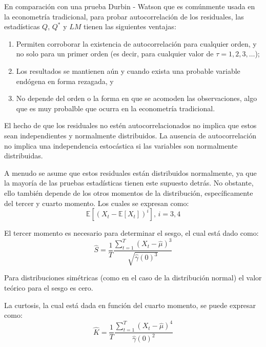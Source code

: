 \documentclass[
]{book}
\begin{document}
En comparación con una prueba Durbin - Watson que es comúnmente usada en la econometría tradicional, para probar autocorrelación de los residuales, las estadísticas \(Q\), \(Q^*\) y \(LM\) tienen las siguientes ventajas:

\begin{enumerate}
\def\labelenumi{\arabic{enumi}.}
\item
  Permiten corroborar la existencia de autocorrelación para cualquier orden, y no solo para un primer orden (es decir, para cualquier valor de \(\tau = 1, 2, 3, \ldots\));
\item
  Los resultados se mantienen aún y cuando exista una probable variable endógena en forma rezagada, y
\item
  No depende del orden o la forma en que se acomoden las observaciones, algo que es muy probalble que ocurra en la econometría tradicional.
\end{enumerate}

El hecho de que los residuales no estén autocorrelacionados no implica que estos sean independientes y normalmente distribuidos. La ausencia de autocorrelación no implica una independencia estocástica si las variables son normalmente distribuidas.

A menudo se asume que estos residuales están distribuidos normalmente, ya que la mayoría de las pruebas estadísticas tienen este supuesto detrás. No obstante, ello también depende de los otros momentos de la distribución, específicamente del tercer y cuarto momento. Los cuales se expresan como:
\begin{equation*}
    \mathbb{E}[(X_t - \mathbb{E}[X_t])^i] \mbox{, } i = 3, 4
\end{equation*}

El tercer momento es necesario para determinar el sesgo, el cual está dado como:
\begin{equation}
    \hat{S} = \frac{1}{T} \frac{\sum_{t = 1}^{T} (X_t - \hat{\mu})^3}{\sqrt{\hat{\gamma}(0)^3}}
    \label{eq:eqautocorr6}
\end{equation}

Para distribuciones simétricas (como en el caso de la distribución normal) el valor teórico para el sesgo es cero.

La curtosis, la cual está dada en función del cuarto momento, se puede expresar como:
\begin{equation}
    \hat{K} = \frac{1}{T} \frac{\sum_{t = 1}^{T} (X_t - \hat{\mu})^4}{\hat{\gamma}(0)^2}
    \label{eq:eqautocorr7}
\end{equation}
\end{document}

